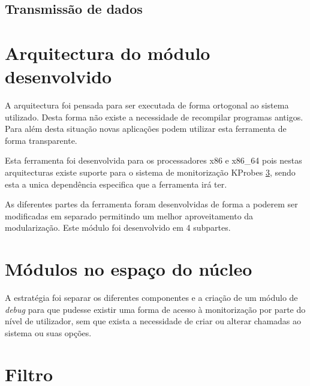 



\subsection{Transmissão de dados}



\section{Arquitectura do módulo desenvolvido}

A arquitectura foi pensada para ser executada de forma ortogonal ao sistema
utilizado. Desta forma não existe a necessidade de recompilar programas
antigos. Para além desta situação novas aplicações podem utilizar esta
ferramenta de forma transparente.

Esta ferramenta foi desenvolvida para os processadores x86 e x86\_64 pois nestas
arquitecturas existe suporte para o sistema de monitorização KProbes \ref{},
sendo esta a unica dependência especifica que a ferramenta irá ter.

As diferentes partes da ferramenta foram desenvolvidas de forma a poderem ser
modificadas em separado permitindo um melhor aproveitamento da modularização.
Este módulo foi desenvolvido em 4 subpartes. 

\section{Módulos no espaço do núcleo}
A estratégia foi separar os diferentes componentes e a criação de um módulo de \textit{debug} para que pudesse existir uma forma de acesso à monitorização por parte do nível de utilizador, sem que exista a necessidade de criar ou alterar chamadas ao sistema ou suas opções.

\section{Filtro}

